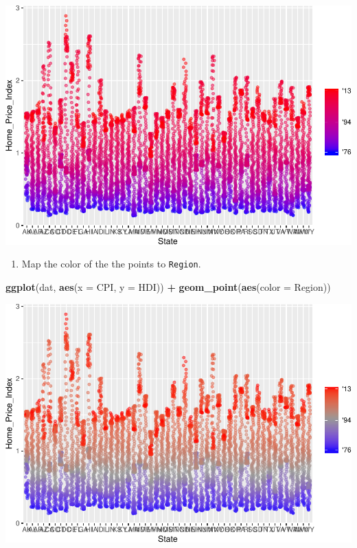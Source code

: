 \documentclass[
]{book}
\newenvironment{Shaded}{\begin{snugshade}}{\end{snugshade}}
\newcommand{\DataTypeTok}[1]{\textcolor[rgb]{0.13,0.29,0.53}{#1}}
\newcommand{\KeywordTok}[1]{\textcolor[rgb]{0.13,0.29,0.53}{\textbf{#1}}}
\newcommand{\NormalTok}[1]{#1}
\newcommand{\OperatorTok}[1]{\textcolor[rgb]{0.81,0.36,0.00}{\textbf{#1}}}
\newcommand{\StringTok}[1]{\textcolor[rgb]{0.31,0.60,0.02}{#1}}
\providecommand{\tightlist}{%
  \setlength{\itemsep}{0pt}\setlength{\parskip}{0pt}}
\begin{document}
\begin{alert}
\includegraphics{R/Rgraphics/figures/unnamed-chunk-175-1.pdf}

\begin{enumerate}
\def\labelenumi{\arabic{enumi}.}
\setcounter{enumi}{2}
\tightlist
\item
  Map the color of the the points to \texttt{Region}.
\end{enumerate}

\begin{Shaded}
\begin{Highlighting}[]
\KeywordTok{ggplot}\NormalTok{(dat, }\KeywordTok{aes}\NormalTok{(}\DataTypeTok{x =}\NormalTok{ CPI, }\DataTypeTok{y =}\NormalTok{ HDI)) }\OperatorTok{+}
\StringTok{  }\KeywordTok{geom\_point}\NormalTok{(}\KeywordTok{aes}\NormalTok{(}\DataTypeTok{color =}\NormalTok{ Region))}
\end{Highlighting}
\end{Shaded}

\includegraphics{R/Rgraphics/figures/unnamed-chunk-176-1.pdf}


\end{alert}
\end{document}
